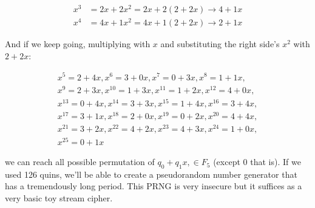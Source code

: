 \documentclass{article}
\begin{document}
\begin{align*}
  x^3 &= 2x + 2x^2 = 2x + 2(2 +2x) \rightarrow 4 + 1x \\
  x^4 &= 4x + 1x^2 = 4x + 1(2 +2x) \rightarrow 2 + 1x
\end{align*}

And
if we keep going, multiplying with $x$ and substituting the right side's $x^2$ with $2+2x$:

\begin{align*}
  x^{5} = 2 + 4x , x^{6} = 3 + 0x ,x^{7} = 0 + 3x ,x^{8} = 1 + 1x , \\
  x^{9} = 2 + 3x , x^{10} = 1 + 3x ,x^{11} = 1 + 2x ,x^{12} = 4 + 0x ,\\
  x^{13} = 0 + 4x, x^{14} = 3 + 3x ,x^{15} = 1 + 4x ,x^{16} = 3 + 4x ,\\
  x^{17} = 3 + 1x , x^{18} = 2 + 0x ,x^{19} = 0 + 2x ,x^{20} = 4 + 4x ,\\
  x^{21} = 3 + 2x , x^{22} = 4 + 2x ,x^{23} = 4 + 3x ,x^{24} = 1 + 0x ,\\
  x^{25} = 0 + 1x
\end{align*}

we can reach all possible permutation of $q_0 + q_1 x, \in F_5$ (except 0 that is). If we
used 126 quins, we'll be able to create a pseudorandom number generator
that has a tremendously long period. This PRNG is very insecure but it
suffices as a very basic toy stream cipher.

\end{document}
